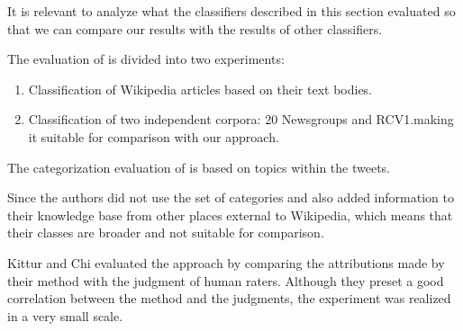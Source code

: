 It is relevant to analyze what the classifiers described in this section evaluated so that we can compare our results
with the results of other classifiers. 

The evaluation of \cite{schonhofen2009identifying} is divided into two experiments: 

\begin{enumerate}

\item Classification of Wikipedia articles based on their text bodies.
\item Classification of two independent corpora: 20 Newsgroups and RCV1.making it suitable for comparison with our approach.

\end{enumerate}


The categorization evaluation of \cite{gattani2013entity} is based on topics within the tweets.

Since the authors did not use the set of categories and also added information to their knowledge
base from other places external to Wikipedia, which means that their classes are broader and not suitable for comparison. 

Kittur and Chi \cite{kittur2009s} evaluated the approach by comparing the attributions made by their method with the judgment of human raters. Although they preset a good correlation between the method and the judgments, the experiment was realized in a very small scale. 

